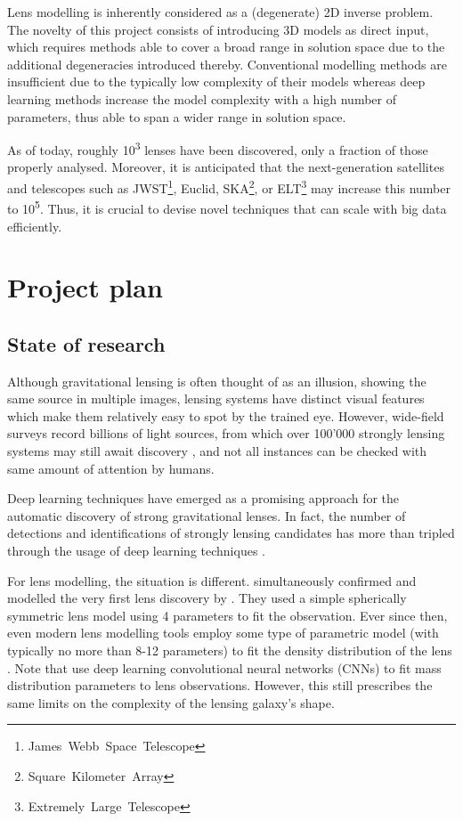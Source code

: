 \documentclass[a4paper,10pt]{article}
\begin{document}
Lens modelling is inherently considered as a (degenerate) 2D inverse
problem. The novelty of this project consists of introducing 3D models
as direct input, which requires methods able to cover a broad range in
solution space due to the additional degeneracies introduced
thereby. Conventional modelling methods are insufficient due to the
typically low complexity of their models whereas deep learning methods
increase the model complexity with a high number of parameters, thus
able to span a wider range in solution space.

As of today, roughly 10\textsuperscript{3} lenses have been discovered, only a fraction
of those properly analysed. Moreover, it is anticipated that the
next-generation satellites and telescopes such as
JWST\footnote{James~Webb~Space~Telescope}, Euclid,
SKA\footnote{Square~Kilometer~Array}, or
ELT\footnote{Extremely~Large~Telescope} may increase this number to
10\textsuperscript{5}. Thus, it is crucial to devise novel techniques that can scale
with big data efficiently.


\newpage
\section*{Project plan}
\label{sec:orgc85dcc3}

\subsection*{State of research}
\label{sec:org7ea7dca}

Although gravitational lensing is often thought of as an illusion,
showing the same source in multiple images, lensing systems have
distinct visual features which make them relatively easy to spot by
the trained eye. However, wide-field surveys record billions of light
sources, from which over 100'000 strongly lensing systems may still
await discovery \citep{Taak20,Taak23,Collett15}, and not all
instances can be checked with same amount of attention by humans.

Deep learning techniques have emerged as a promising approach for the
automatic discovery of strong gravitational lenses. In fact, the
number of detections and identifications of strongly lensing
candidates has more than tripled through the usage of deep learning
techniques \citep{Storfer22,Huang21,Rezaei22,Wilde22}.

For lens modelling, the situation is different. \cite{Young80}
simultaneously confirmed and modelled the very first lens discovery by
\cite{Walsh79}. They used a simple spherically symmetric lens model
using 4 parameters to fit the observation. Ever since then, even
modern lens modelling tools employ some type of parametric model (with
typically no more than 8-12 parameters) to fit the density
distribution of the lens
\citep[cf.][]{Birrer18,Hezaveh17,Tessore16,Oguri10}. Note that
\cite{Hezaveh17} use deep learning convolutional neural networks
(CNNs) to fit mass distribution parameters to lens
observations. However, this still prescribes the same limits on the
complexity of the lensing galaxy's shape.
\end{document}
